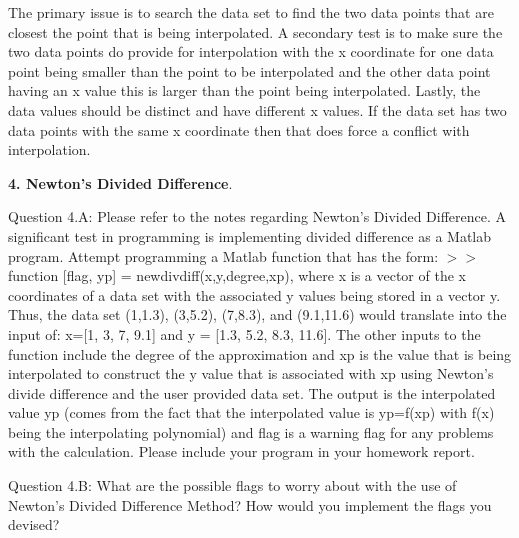 \documentclass{article}
\begin{document}
{\color{teal}The primary issue is to search the data set to find the two data points that are closest the point that is being interpolated. A secondary test is to make sure the two data points do provide for interpolation with the x coordinate for one data point being smaller than the point to be interpolated and the other data point having an x value this is larger than the point being interpolated. Lastly, the data values should be distinct and have different x values. If the data set has two data points with the same x coordinate then that does force a conflict with interpolation. }  
\medskip \par \noindent
%
{\bf 4. Newton's Divided Difference}. \medskip \par
Question 4.A: Please refer to the notes regarding Newton's Divided Difference. A significant test in programming is implementing divided difference as a Matlab program. Attempt programming a Matlab function that has the form: $>>$function [flag, yp] = newdivdiff(x,y,degree,xp), where x is a vector of the x coordinates of a data set with the associated y values being stored in a vector y. Thus, the data set (1,1.3), (3,5.2), (7,8.3), and (9.1,11.6) would translate into the input of: x=[1, 3, 7, 9.1] and y = [1.3, 5.2, 8.3, 11.6]. The other inputs to the function include the degree of the approximation and xp is the value that is being interpolated to construct the y value that is associated with xp using Newton's divide difference and the user provided data set. The output is the interpolated value yp (comes from the fact that the interpolated value is yp=f(xp) with f(x) being the interpolating polynomial) and flag is a warning flag for any problems with the calculation. Please include your program in your homework report. 
\medskip \par \noindent
Question 4.B: What are the possible flags to worry about with the use of Newton's Divided Difference Method? How would you implement the flags you devised?
\end{document}
